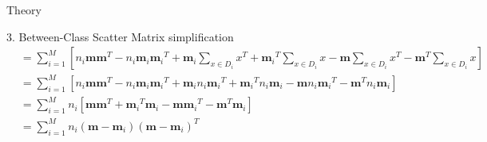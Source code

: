 \begin{section}{Theory}
\begin{homeworkSection}{3. Between-Class Scatter Matrix simplification}
{\begin{align*}
		&= \sum_{i=1}^M \left [ n_i \bm{m}\bm{m}^T - n_i \bm{m}_i {\bm{m}_i}^T + \bm{m}_i \sum_{x \in D_i} x^T + {\bm{m}_i}^T \sum_{x \in D_i} x - \bm{m} \sum_{x \in D_i} x^T - \bm{m}^T \sum_{x \in D_i} x \right ] \\
		&= \sum_{i=1}^M \left [ n_i \bm{m}\bm{m}^T - n_i \bm{m}_i {\bm{m}_i}^T + \bm{m}_i n_i {\bm{m}_i}^T + {\bm{m}_i}^T n_i {\bm{m}_i} - \bm{m} n_i {\bm{m}_i}^T - \bm{m}^T n_i {\bm{m}_i} \right ] \\
		&= \sum_{i=1}^M n_i \left [ \bm{m}\bm{m}^T + {\bm{m}_i}^T {\bm{m}_i} - \bm{m} {\bm{m}_i}^T - \bm{m}^T {\bm{m}_i} \right ] \\
		&= \sum_{i=1}^M n_i (\bm{m} - \bm{m}_i)(\bm{m} - \bm{m}_i)^T
		\\
	\end{align*}
}
\end{homeworkSection}

\end{section}

